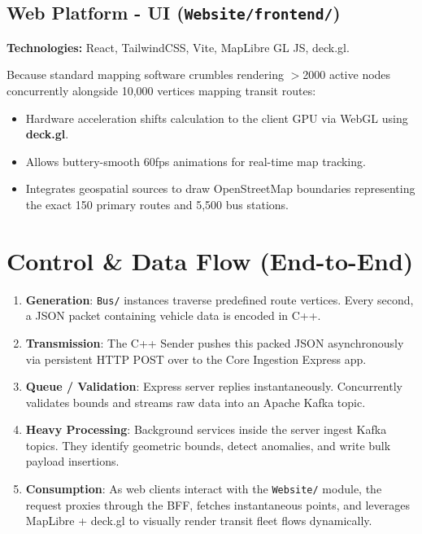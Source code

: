 \documentclass[12pt, a4paper]{article}
\begin{document}
\subsection{Web Platform - UI (\texttt{Website/frontend/})}
\textbf{Technologies:} React, TailwindCSS, Vite, MapLibre GL JS, deck.gl.

Because standard mapping software crumbles rendering $>$2000 active nodes concurrently alongside 10,000 vertices mapping transit routes:
\begin{itemize}
    \item Hardware acceleration shifts calculation to the client GPU via WebGL using \textbf{deck.gl}.
    \item Allows buttery-smooth 60fps animations for real-time map tracking.
    \item Integrates geospatial sources to draw OpenStreetMap boundaries representing the exact 150 primary routes and 5,500 bus stations.
\end{itemize}

\section{Control \& Data Flow (End-to-End)}
\begin{enumerate}
    \item \textbf{Generation}: \texttt{Bus/} instances traverse predefined route vertices. Every second, a JSON packet containing vehicle data is encoded in C++.
    \item \textbf{Transmission}: The C++ Sender pushes this packed JSON asynchronously via persistent HTTP POST over to the Core Ingestion Express app.
    \item \textbf{Queue / Validation}: Express server replies instantaneously. Concurrently validates bounds and streams raw data into an Apache Kafka topic.
    \item \textbf{Heavy Processing}: Background services inside the server ingest Kafka topics. They identify geometric bounds, detect anomalies, and write bulk payload insertions.
    \item \textbf{Consumption}: As web clients interact with the \texttt{Website/} module, the request proxies through the BFF, fetches instantaneous points, and leverages MapLibre + deck.gl to visually render transit fleet flows dynamically.
\end{enumerate}
\end{document}
